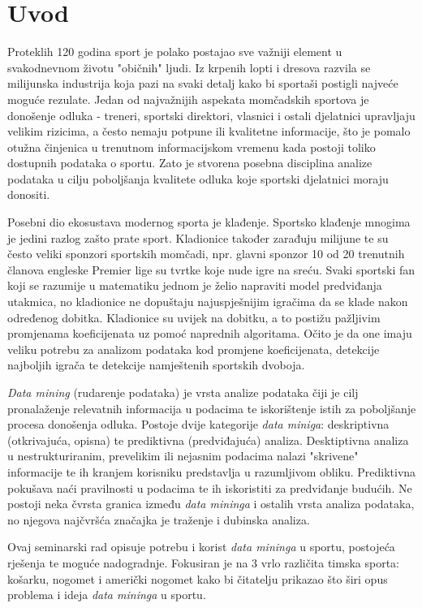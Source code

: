 \documentclass{ferseminar}
\begin{document}
\stvoripredstranice
\section{Uvod}

Proteklih 120 godina sport je polako postajao sve važniji element u svakodnevnom životu "običnih" ljudi. Iz krpenih lopti i dresova razvila se milijunska industrija koja pazi na svaki detalj kako bi sportaši postigli najveće moguće rezulate. Jedan od najvažnijih aspekata momčadskih sportova je donošenje odluka - treneri, sportski direktori, vlasnici i ostali djelatnici upravljaju velikim rizicima, a često nemaju potpune ili kvalitetne informacije, što je pomalo otužna činjenica u trenutnom informacijskom vremenu kada postoji toliko dostupnih podataka o sportu. Zato je stvorena posebna disciplina analize podataka u cilju poboljšanja kvalitete odluka koje sportski djelatnici moraju donositi.


Posebni dio ekosustava modernog sporta je klađenje. Sportsko klađenje mnogima je jedini razlog zašto prate sport. Kladionice također zarađuju milijune te su često veliki sponzori sportskih momčadi, npr. glavni sponzor 10 od 20 trenutnih članova engleske Premier lige su tvrtke koje nude igre na sreću. Svaki sportski fan koji se razumije u matematiku jednom je želio napraviti model predviđanja utakmica, no kladionice ne dopuštaju najuspješnijim igračima da se klade nakon određenog dobitka. Kladionice su uvijek na dobitku, a to postižu pažljivim promjenama koeficijenata uz pomoć naprednih algoritama. Očito je da one imaju veliku potrebu za analizom podataka kod promjene koeficijenata, detekcije najboljih igrača te detekcije namještenih sportskih dvoboja.


\textit{Data mining} (rudarenje podataka) je vrsta analize podataka čiji je cilj pronalaženje relevatnih informacija u podacima te iskorištenje istih za poboljšanje procesa donošenja odluka. Postoje dvije kategorije \textit{data miniga}: deskriptivna (otkrivajuća, opisna) te prediktivna (predviđajuća) analiza. Desktiptivna analiza u nestrukturiranim, prevelikim ili nejasnim podacima nalazi "skrivene" informacije te ih kranjem korisniku predstavlja u razumljivom obliku. Prediktivna pokušava naći pravilnosti u podacima te ih iskoristiti za predviđanje budućih. Ne postoji neka čvrsta granica između \textit{data mininga} i ostalih vrsta analiza podataka, no njegova najčvršća značajka je traženje i dubinska analiza.


Ovaj seminarski rad opisuje potrebu i korist \textit{data mininga} u sportu, postojeća rješenja te moguće nadogradnje. Fokusiran je na 3 vrlo različita timska sporta: košarku, nogomet i američki nogomet kako bi čitatelju prikazao što širi opus problema i ideja \textit{data mininga} u sportu.
\end{document}
